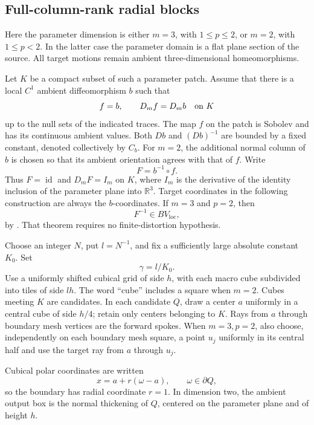 \documentclass[11pt]{article}
\numberwithin{equation}{section}
\theoremstyle{definition}
\theoremstyle{remark}
\newcommand{\R}{\mathbb R}
\newcommand{\Id}{\operatorname{id}}
\begin{document}
\subsection{Full-column-rank radial blocks}

Here the parameter dimension is either $m=3$, with $1\le p\le2$, or
$m=2$, with $1\le p<2$.  In the latter case the parameter domain is a
flat plane section of the source.  All target motions remain ambient
three-dimensional homeomorphisms.

Let $K$ be a compact subset of such a parameter patch.  Assume that
there is a local $C^1$ ambient diffeomorphism $b$ such that
\begin{equation}\label{la:identity-jets}
 f=b,\qquad D_m f=D_m b\quad\hbox{on }K
\end{equation}
up to the null sets of the indicated traces.  The map $f$ on the patch
is Sobolev and has its continuous ambient values.  Both $Db$ and
$(Db)^{-1}$ are bounded by a fixed constant, denoted collectively by
$C_b$.  For $m=2$, the additional normal column of $b$ is chosen so
that its ambient orientation agrees with that of $f$.
Write
\[
 F=b^{-1}\circ f.
\]
Thus $F=\Id$ and $D_mF=I_m$ on $K$, where $I_m$ is the derivative
of the identity inclusion of the parameter plane into $\R^3$.
Target coordinates in the following construction are always the
$b$-coordinates.  If $m=3$ and $p=2$, then
\begin{equation}\label{la:inverse-bv}
 F^{-1}\in BV_{\mathrm{loc}},
\end{equation}
by \cite[Theorem~1.1]{CsornyeiHenclMaly2010}.  That theorem requires no
finite-distortion hypothesis.

Choose an integer $N$, put $l=N^{-1}$, and fix a sufficiently large
absolute constant $K_0$.  Set
\begin{equation}\label{la:gamma}
 \gamma=l/K_0.
\end{equation}
Use a uniformly shifted cubical grid of side $h$, with each macro cube
subdivided into tiles of side $lh$.  The word ``cube'' includes a
square when $m=2$.  Cubes meeting $K$ are candidates.  In each candidate
$Q$, draw a center $a$ uniformly in a central cube of side $h/4$; retain
only centers belonging to $K$.  Rays from $a$ through boundary mesh
vertices are the forward spokes.  When $m=3,p=2$, also choose,
independently on each boundary mesh square, a point $u_j$ uniformly in
its central half and use the target ray from $a$ through $u_j$.

Cubical polar coordinates are written
\[
 x=a+r(\omega-a),\qquad \omega\in\partial Q,
\]
so the boundary has radial coordinate $r=1$.  In dimension two, the
ambient output box is the normal thickening of $Q$, centered on the
parameter plane and of height $h$.
\end{document}
